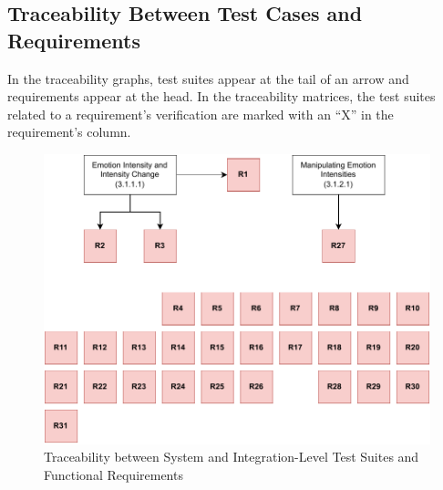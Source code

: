 \subsection{Traceability Between Test Cases and Requirements}
In the traceability graphs, test suites appear at the tail of an arrow and
requirements appear at the head. In the traceability matrices, the test suites
related to a requirement's verification are marked with an ``X'' in the
requirement's column.

\vspace*{\fill}
\begin{figure}[tbh]
    \centering
    \includegraphics[width=0.9\linewidth]{figures/testSuites2funreqs.pdf}
    \caption{Traceability between System and Integration-Level Test Suites and
    Functional Requirements}
    \label{fig:traceSystemTS2FunReqs}
\end{figure}
\vspace*{\fill}

